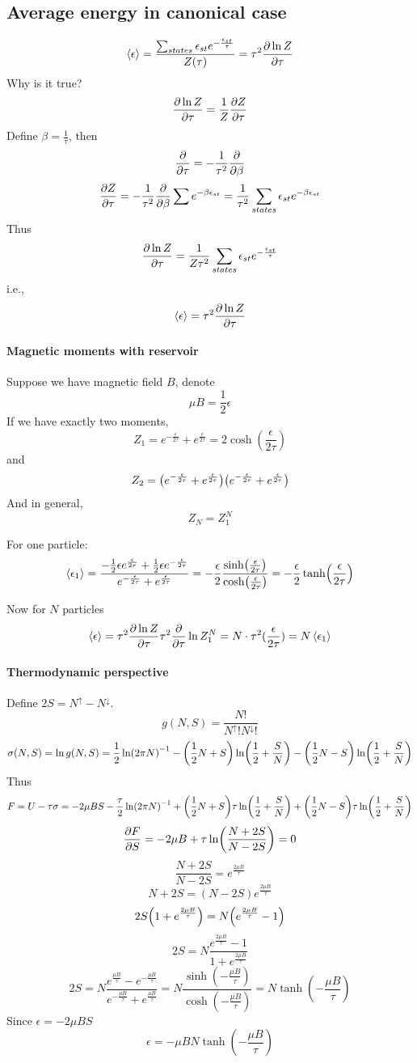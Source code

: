 \subsection{Average energy in canonical case}
$$\expval{\epsilon} = \frac{\sum_{states} \epsilon_{st} e^{-\frac{\epsilon_{st}}{\tau}}}{Z(\tau)} = \tau^2 \pdv{\ln Z}{\tau}$$
Why is it true?
$$\pdv{\ln Z}{\tau} = \frac{1}{Z} \pdv{Z}{\tau} $$
Define $\beta = \frac{1}{\tau}$, then
$$\pdv{\tau} = -\frac{1}{\tau^2} \pdv{\beta}$$
$$\pdv{Z}{\tau} = -\frac{1}{\tau^2} \pdv{\beta} \sum e^{-\beta \epsilon_{st}} = \frac{1}{\tau^2} \sum_{states} \epsilon_{st} e^{-\beta \epsilon_{st}} $$
Thus
$$\pdv{\ln Z}{\tau} = \frac{1}{Z\tau^2} \sum_{states} \epsilon_{st} e^{-\frac{\epsilon_{st}}{\tau} }  $$
i.e.,
$$\expval{\epsilon} = \tau^2 \pdv{\ln Z}{\tau}$$
\paragraph{Magnetic moments with reservoir}
Suppose we have magnetic field $B$, denote
$$\mu B = \frac{1}{2} \epsilon$$
If we have exactly two moments,
$$Z_1 = e^{-\frac{\epsilon}{2\tau}}+e^{\frac{\epsilon}{2\tau}} = 2\cosh(\frac{\epsilon}{2\tau})$$
and
$$Z_2 = \qty( e^{-\frac{\epsilon}{2\tau}}+e^{\frac{\epsilon}{2\tau}} )\qty( e^{-\frac{\epsilon}{2\tau}}+e^{\frac{\epsilon}{2\tau}} ) $$
And in general,
$$Z_N = Z_1^N$$

For one particle:
$$\expval{\epsilon_1} = \frac{-\frac{1}{2} \epsilon e^{\frac{\epsilon}{2\tau}}+\frac{1}{2} \epsilon e^{-\frac{\epsilon}{2\tau}}}{ e^{-\frac{\epsilon}{2\tau}}+e^{\frac{\epsilon}{2\tau}}} = -\frac{\epsilon}{2} \frac{\sinh(\frac{\epsilon}{2\tau})}{\cosh(\frac{\epsilon}{2\tau})} = -\frac{\epsilon}{2}\tanh(\frac{\epsilon}{2\tau})$$

Now for $N$ particles
$$\expval{\epsilon} = \tau^2 \pdv{\ln Z}{\tau} \tau^2 \pdv{\tau} \ln Z_1^N = N \cdot \tau^2 (\frac{\epsilon}{2\tau}) = N \expval{\epsilon_1}$$
\paragraph{Thermodynamic perspective}
Define $2S = N^{\uparrow} - N^{\downarrow}$.
$$g(N,S) = \frac{N!}{N^{\uparrow}! N^{\downarrow}!}$$
$$\sigma(N,S) = \ln g(N,S) = \frac{1}{2} \ln(2\pi N)^{-1} - \qty(\frac{1}{2}N+S) \ln(\frac{1}{2}+\frac{S}{N}) -\qty(\frac{1}{2}N-S ) \ln(\frac{1}{2} + \frac{S}{N})$$
Thus
$$F = U -\tau \sigma = -2\mu BS - \frac{\tau}{2} \ln(2\pi N)^{-1}+ \qty(\frac{1}{2}N+S)\tau \ln(\frac{1}{2}+\frac{S}{N}) +\qty(\frac{1}{2}N-S )\tau \ln(\frac{1}{2} + \frac{S}{N}) $$ 
$$\pdv{F}{S} = -2\mu B +\tau \ln(\frac{N+2S}{N-2S}) = 0$$
$$\frac{N+2S}{N-2S} = e^{\frac{2\mu B}{\tau}}$$
$$N+2S = (N-2S)e^{\frac{2\mu B}{\tau}}$$
$$2S\qty(1+e^{\frac{2\mu B}{\tau}}) = N\qty(e^{\frac{2\mu B}{\tau}}-1)$$
$$2S = N\frac{e^{\frac{2\mu B}{\tau}}-1}{1+e^{\frac{2\mu B}{\tau}}}$$
$$2S = N\frac{e^{\frac{\mu B}{\tau}}-e^{-\frac{\mu B}{\tau}}}{e^{-\frac{\mu B}{\tau}}+e^{\frac{\mu B}{\tau}}} = N\frac{\sinh(-\frac{\mu B}{\tau})}{\cosh(-\frac{\mu B}{\tau})} =N \tanh(-\frac{\mu B}{\tau})$$
Since $\epsilon = -2\mu B S$
$$\epsilon = -\mu B N  \tanh(-\frac{\mu B}{\tau})$$
